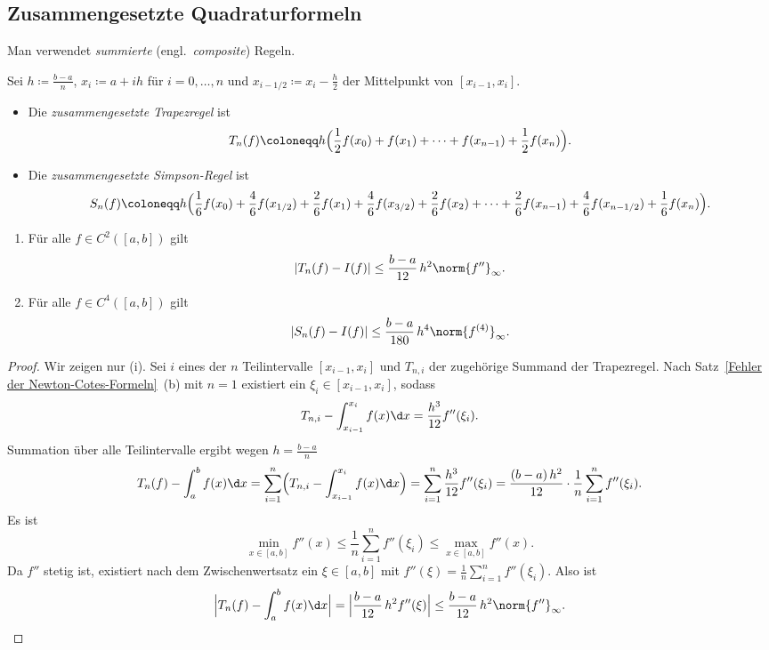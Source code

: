 \documentclass[11pt]{article}
\begin{document}
\subsection{Zusammengesetzte Quadraturformeln}


Man verwendet \emph{summierte} (engl.\ \textit{composite}) Regeln.
\begin{ergaenzung}
Sei $h \coloneqq \frac{b - a}{n}$, $x_i \coloneqq a + ih$ für $i = 0, \dots, n$ und $x_{i-1/2} \coloneqq x_i - \frac{h}{2}$ der Mittelpunkt von $[x_{i-1}, x_i]$.
\end{ergaenzung}
\begin{itemize}
  \item Die \emph{zusammengesetzte Trapezregel} ist
    \[ T_n(f) \coloneqq h \Bigl( \frac{1}{2} f(x_0) + f(x_1) + \dots + f(x_{n-1}) + \frac{1}{2} f(x_n) \Bigr). \]
  \item Die \emph{zusammengesetzte Simpson-Regel} ist
    \[ S_n(f) \coloneqq h \Bigl( \frac{1}{6} f(x_0) + \frac{4}{6} f(x_{1/2}) + \frac{2}{6} f(x_1) + \frac{4}{6} f(x_{3/2}) + \frac{2}{6} f(x_2) + \dots + \frac{2}{6} f(x_{n-1}) + \frac{4}{6} f(x_{n-1/2}) + \frac{1}{6} f(x_n) \Bigr). \]
\end{itemize}


\begin{theorem}\Theorem
  \begin{enumerate}[label=(\roman*)]
    \item Für alle $f \in C^2([a, b])$ gilt
      \[ \lvert T_n(f) - I(f) \rvert \le \frac{b - a}{12}\, h^2 \norm{f''}_\infty. \]
    \item Für alle $f \in C^4([a, b])$ gilt
      \[ \lvert S_n(f) - I(f) \rvert \le \frac{b - a}{180}\, h^4 \norm{f^{(4)}}_\infty. \]
  \end{enumerate}
\end{theorem}


\begin{proof}
  Wir zeigen nur (i). Sei $i$ eines der $n$ Teilintervalle $[x_{i-1}, x_i]$ und $T_{n,i}$ der zugehörige Summand der Trapezregel.
Nach Satz~\ref{Fehler der Newton-Cotes-Formeln}~(b) mit $n = 1$ existiert ein $\xi_i \in [x_{i-1}, x_i]$, sodass
  \[ T_{n,i} - \int_{x_{i-1}}^{x_i} f(x) \d x = \frac{h^3}{12} f''(\xi_i). \]
Summation über alle Teilintervalle ergibt wegen $h = \frac{b - a}{n}$
  \[
    T_n(f) - \int_a^b f(x) \d x = \sum_{i=1}^{n} \Bigl( T_{n,i} - \int_{x_{i-1}}^{x_i} f(x) \d x \Bigr) = \sum_{i=1}^{n} \frac{h^3}{12} f''(\xi_i) = \frac{(b - a)\, h^2}{12} \cdot \frac{1}{n} \sum_{i=1}^{n} f''(\xi_i).
  \]
  Es ist
  \[ \min_{x \in [a, b]} f''(x) \le \frac{1}{n} \sum_{i=1}^{n} f''(\xi_i) \le \max_{x \in [a, b]} f''(x). \]
  Da $f''$ stetig ist, existiert nach dem Zwischenwertsatz ein $\xi \in [a, b]$ mit $f''(\xi) = \frac{1}{n} \sum_{i=1}^{n} f''(\xi_i)$. Also ist
  \[ \Bigl\lvert T_n(f) - \int_a^b f(x) \d x \Bigr\rvert = \Bigl\lvert \frac{b - a}{12}\, h^2 f''(\xi) \Bigr\rvert \le \frac{b - a}{12}\, h^2 \norm{f''}_\infty. \qedhere \]
\end{proof}
\end{document}
